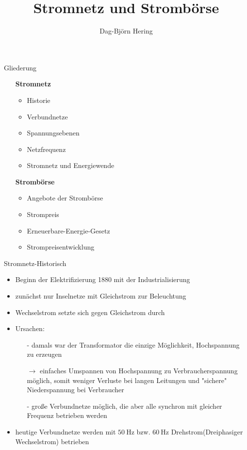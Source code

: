 \documentclass[aspectratio=1610, professionalfonts, 9pt]{beamer}
\title{Stromnetz und Strombörse}
\author[D.~Hering]{Dag-Björn Hering}
\begin{document}
\maketitle

\begin{frame}{Gliederung}
\begin{itemize}
  \item[] \textbf{\textcolor{tugreen}{Stromnetz}}
  \begin{itemize}
  \item Historie
  \item Verbundnetze
  \item Spannungsebenen
  \item Netzfrequenz
  \item Stromnetz und Energiewende
  \end{itemize}
  \item[] \textbf{\textcolor{tugreen}{Strombörse}}
  \begin{itemize}
    \item Angebote der Strombörse
    \item Strompreis
    \item Erneuerbare-Energie-Gesetz
    \item Strompreisentwicklung
  \end{itemize}
\end{itemize}
\end{frame}





\begin{frame}{Stromnetz-Historisch}
\begin{itemize}
  \item Beginn der Elektrifizierung 1880 mit der Industrialisierung
  \item zunächst nur Inselnetze mit Gleichstrom zur Beleuchtung
  \item Wechselstrom setzte sich gegen Gleichstrom durch
  \item Ursachen:
  \begin{itemize}
    \item[-] damals war der Transformator die einzige Möglichkeit, Hochspannung zu erzeugen
    \item[$\rightarrow$] einfaches Umspannen von Hochspannung zu Verbraucherspannung möglich,
    somit weniger Verluste bei langen Leitungen und "sichere" Niederspannung bei Verbraucher
    \item[-] große Verbundnetze möglich, die aber alle synchron mit gleicher Frequenz betrieben werden
  \end{itemize}
  \item heutige Verbundnetze werden mit $\SI{50}{\hertz}$ bzw. $\SI{60}{\hertz}$ Drehstrom(Dreiphasiger Wechselstrom) betrieben
\end{itemize}
\end{frame}
%
\end{document}
